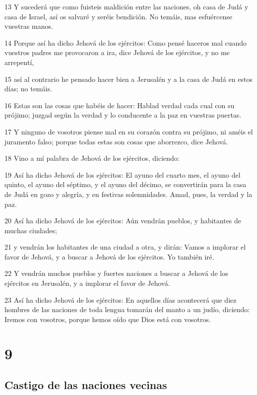 \par 13 Y sucederá que como fuisteis maldición entre las naciones, oh casa de Judá y casa de Israel, así os salvaré y seréis bendición. No temáis, mas esfuércense vuestras manos.
\par 14 Porque así ha dicho Jehová de los ejércitos: Como pensé haceros mal cuando vuestros padres me provocaron a ira, dice Jehová de los ejércitos, y no me arrepentí,
\par 15 así al contrario he pensado hacer bien a Jerusalén y a la casa de Judá en estos días; no temáis.
\par 16 Estas son las cosas que habéis de hacer: Hablad verdad cada cual con su prójimo; juzgad según la verdad y lo conducente a la paz en vuestras puertas.
\par 17 Y ninguno de vosotros piense mal en su corazón contra su prójimo, ni améis el juramento falso; porque todas estas son cosas que aborrezco, dice Jehová.
\par 18 Vino a mí palabra de Jehová de los ejércitos, diciendo:
\par 19 Así ha dicho Jehová de los ejércitos: El ayuno del cuarto mes, el ayuno del quinto, el ayuno del séptimo, y el ayuno del décimo, se convertirán para la casa de Judá en gozo y alegría, y en festivas solemnidades. Amad, pues, la verdad y la paz.
\par 20 Así ha dicho Jehová de los ejércitos: Aún vendrán pueblos, y habitantes de muchas ciudades;
\par 21 y vendrán los habitantes de una ciudad a otra, y dirán: Vamos a implorar el favor de Jehová, y a buscar a Jehová de los ejércitos. Yo también iré.
\par 22 Y vendrán muchos pueblos y fuertes naciones a buscar a Jehová de los ejércitos en Jerusalén, y a implorar el favor de Jehová.
\par 23 Así ha dicho Jehová de los ejércitos: En aquellos días acontecerá que diez hombres de las naciones de toda lengua tomarán del manto a un judío, diciendo: Iremos con vosotros, porque hemos oído que Dios está con vosotros.

\chapter{9}

\section*{Castigo de las naciones vecinas}

